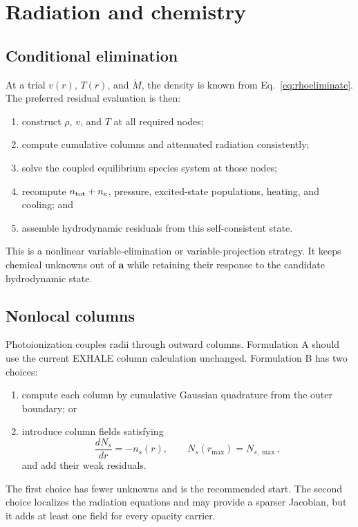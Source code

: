 \documentclass[english,a4paper]{my_memo}
\newcommand{\vect}[1]{\mathbf{#1}}
\newcommand{\coef}{\vect{a}}
\newcommand{\mdot}{\dot M}
\begin{document}
\section{Radiation and chemistry}\label{sec:microphysics}

\subsection{Conditional elimination}

At a trial \(v(r)\), \(T(r)\), and \(\mdot\), the density is known from
Eq.~\eqref{eq:rhoeliminate}.  The preferred residual evaluation is then:
\begin{enumerate}
\item construct \(\rho\), \(v\), and \(T\) at all required nodes;
\item compute cumulative columns and attenuated radiation consistently;
\item solve the coupled equilibrium species system at those nodes;
\item recompute \(n_{\rm tot}+n_e\), pressure, excited-state populations,
  heating, and cooling; and
\item assemble hydrodynamic residuals from this self-consistent state.
\end{enumerate}
This is a nonlinear variable-elimination or variable-projection strategy.  It
keeps chemical unknowns out of \(\coef\) while retaining their response to the
candidate hydrodynamic state.

\subsection{Nonlocal columns}

Photoionization couples radii through outward columns.  Formulation A should use
the current EXHALE column calculation unchanged.  Formulation B has two choices:
\begin{enumerate}
\item compute each column by cumulative Gaussian quadrature from the outer
  boundary; or
\item introduce column fields satisfying
  \begin{equation}
   \frac{dN_s}{dr}=-n_s(r), \qquad N_s(r_{\max})=N_{s,\max},
   \label{eq:columnode}
  \end{equation}
  and add their weak residuals.
\end{enumerate}
The first choice has fewer unknowns and is the recommended start.  The second
choice localizes the radiation equations and may provide a sparser Jacobian,
but it adds at least one field for every opacity carrier.
\end{document}
